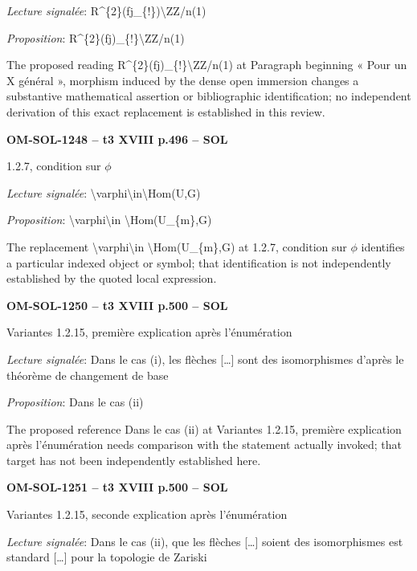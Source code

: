 \emph{Lecture signalée}: R\textasciicircum{}\{2\}(fj\_\{!\})\textbackslash{}ZZ/n(1)\par
\emph{Proposition}: R\textasciicircum{}\{2\}(fj)\_\{!\}\textbackslash{}ZZ/n(1)\par
The proposed reading R\textasciicircum{}\{2\}(fj)\_\{!\}\textbackslash{}ZZ/n(1) at Paragraph beginning « Pour un X général », morphism induced by the dense open immersion changes a substantive mathematical assertion or bibliographic identification; no independent derivation of this exact replacement is established in this review.\par
\par\noindent\textbf{OM-SOL-1248 -- t3 XVIII p.496 -- SOL}\par
1.2.7, condition sur \ensuremath{\phi}\par
\emph{Lecture signalée}: \textbackslash{}varphi\textbackslash{}in\textbackslash{}Hom(U,G)\par
\emph{Proposition}: \textbackslash{}varphi\textbackslash{}in \textbackslash{}Hom(U\_\{m\},G)\par
The replacement \textbackslash{}varphi\textbackslash{}in \textbackslash{}Hom(U\_\{m\},G) at 1.2.7, condition sur \ensuremath{\phi} identifies a particular indexed object or symbol; that identification is not independently established by the quoted local expression.\par
\par\noindent\textbf{OM-SOL-1250 -- t3 XVIII p.500 -- SOL}\par
Variantes 1.2.15, première explication après l'énumération\par
\emph{Lecture signalée}: Dans le cas (i), les flèches […] sont des isomorphismes d'après le théorème de changement de base\par
\emph{Proposition}: Dans le cas (ii)\par
The proposed reference Dans le cas (ii) at Variantes 1.2.15, première explication après l'énumération needs comparison with the statement actually invoked; that target has not been independently established here.\par
\par\noindent\textbf{OM-SOL-1251 -- t3 XVIII p.500 -- SOL}\par
Variantes 1.2.15, seconde explication après l'énumération\par
\emph{Lecture signalée}: Dans le cas (ii), que les flèches […] soient des isomorphismes est standard […] pour la topologie de Zariski\par
